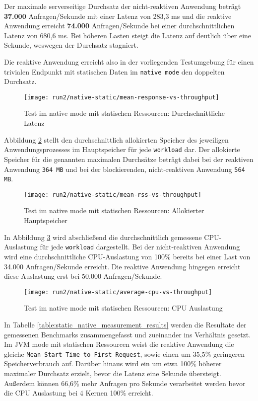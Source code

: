 Der maximale serverseitige Durchsatz der nicht-reaktiven Anwendung beträgt \textbf{37.000} Anfragen/Sekunde mit einer
Latenz von 283,3 ms und
die reaktive Anwendung erreicht \textbf{74.000} Anfragen/Sekunde bei einer durchschnittlichen Latenz von 680,6 ms.
Bei höheren Lasten steigt die Latenz auf deutlich über eine Sekunde, weswegen der Durchsatz stagniert.

Die reaktive Anwendung erreicht also in der vorliegenden Testumgebung für einen trivialen
Endpunkt mit statischen Daten im \verb|native mode| den doppelten Durchsatz.
\newpage
\begin{figure}[ht!]
  \centering
  \texttt{[image: run2/native-static/mean-response-vs-throughput]}
  \caption{Test im native mode mit statischen Ressourcen: Durchschnittliche Latenz}
  \label{fig:native_static_mean_response}
\end{figure}
Abbildung \ref{fig:native_static_mean_rss} stellt den durchschnittlich allokierten Speicher des jeweiligen Anwendungsprozesses
im Hauptspeicher für jede \verb|workload| dar. Der allokierte Speicher für die genannten maximalen Durchsätze beträgt dabei bei
der reaktiven Anwendung \verb|364 MB| und bei der blockierenden, nicht-reaktiven Anwendung \verb|564 MB|.
\newpage
\begin{figure}[ht!]
  \centering
  \texttt{[image: run2/native-static/mean-rss-vs-throughput]}
  \caption{Test im native mode mit statischen Ressourcen: Allokierter Hauptspeicher}
  \label{fig:native_static_mean_rss}
\end{figure}

In Abbildung \ref{fig:native_static_avg_cpu} wird abschließend die durchschnittlich gemessene CPU-Auslastung für jede \verb|workload|
dargestellt. Bei der nicht-reaktiven Anwendung wird eine durchschnittliche CPU-Auslastung von 100\% bereits bei einer Last von
34.000 Anfragen/Sekunde erreicht. Die reaktive Anwendung hingegen erreicht diese Auslastung erst bei 50.000 Anfragen/Sekunde.
\newpage
\begin{figure}[ht!]
  \centering
  \texttt{[image: run2/native-static/average-cpu-vs-throughput]}
  \caption{Test im native mode mit statischen Ressourcen: CPU Auslastung}
  \label{fig:native_static_avg_cpu}
\end{figure}

In Tabelle \ref{table:static_native_measurement_results} werden die Resultate der gemessenen Benchmarks zusammengefasst
und zueinander ins Verhältnis gesetzt. Im JVM mode mit statischen Ressourcen weist die reaktive Anwendung
die gleiche \verb|Mean Start Time to First Request|, sowie
einen um 35,5\% geringeren Speicherverbrauch auf.
Darüber hinaus wird ein um etwa 100\% höherer maximaler Durchsatz erzielt, bevor die Latenz eine Sekunde übersteigt.
Außerdem können 66,6\% mehr Anfragen pro Sekunde verarbeitet werden bevor die CPU Auslastung bei 4 Kernen 100\% erreicht.

